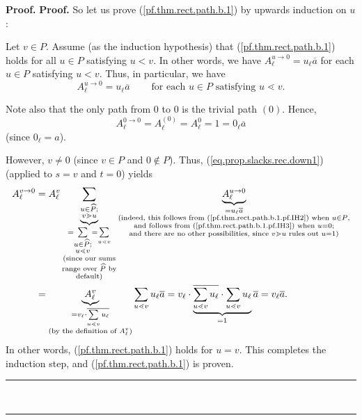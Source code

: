 \documentclass[numbers=enddot,12pt,final,onecolumn,notitlepage]{scrartcl}%
\theoremstyle{definition}
\newenvironment{verlong}{}{}
\newcommand{\downslack}{A}
\newenvironment{proof}[1][Proof]{\noindent\textbf{#1.} }{\ \rule{0.5em}{0.5em}}
\let\sumnonlimits\sum
\renewcommand{\sum}{\sumnonlimits\limits}
\begin{document}
\begin{proof}
\begin{verlong}
\begin{proof}
So let us prove (\ref{pf.thm.rect.path.b.1}) by upwards induction on $u$:

Let $v\in P$. Assume (as the induction hypothesis) that
(\ref{pf.thm.rect.path.b.1}) holds for all $u\in P$ satisfying $u<v$. In other
words, we have $\downslack_{\ell}^{u\rightarrow0}=u_{\ell}\overline{a}$ for
each $u\in P$ satisfying $u<v$. Thus, in particular, we have%
\begin{equation}
\downslack_{\ell}^{u\rightarrow0}=u_{\ell}\overline{a}%
\ \ \ \ \ \ \ \ \ \ \text{for each }u\in P\text{ satisfying }u\lessdot v.
\label{pf.thm.rect.path.b.1.pf.IH2}%
\end{equation}


Note also that the only path from $0$ to $0$ is the trivial path $\left(
0\right)  $. Hence,
\begin{equation}
\downslack_{\ell}^{0\rightarrow0}=\downslack_{\ell}^{\left(  0\right)
}=\downslack_{\ell}^{0}=1=0_{\ell}\overline{a}
\label{pf.thm.rect.path.b.1.pf.IH3}%
\end{equation}
(since $0_{\ell}=a$).

However, $v\neq0$ (since $v\in P$ and $0\notin P$). Thus,
(\ref{eq.prop.slacks.rec.down1}) (applied to $s=v$ and $t=0$) yields%
\begin{align*}
\downslack_{\ell}^{v\rightarrow0}  &  =\downslack_{\ell}^{v}\underbrace{\sum
_{\substack{u\in\widehat{P};\\v\gtrdot u}}}_{\substack{=\sum_{\substack{u\in
\widehat{P};\\u\lessdot v}}=\sum_{u\lessdot v}\\\text{(since our
sums}\\\text{range over }\widehat{P}\text{ by}\\\text{default)}}%
}\underbrace{\downslack_{\ell}^{u\rightarrow0}}_{\substack{=u_{\ell}%
\overline{a}\\\text{(indeed, this follows from
(\ref{pf.thm.rect.path.b.1.pf.IH2}) when }u\in P\text{,}\\\text{and follows
from (\ref{pf.thm.rect.path.b.1.pf.IH3}) when }u=0\text{;}\\\text{and there
are no other possibilities, since }v\gtrdot u\text{ rules out }u=1\text{)}}}\\
&  =\underbrace{\downslack_{\ell}^{v}}_{\substack{=v_{\ell}\cdot\overline
{\sum\limits_{u\lessdot v}u_{\ell}}\\\text{(by the definition of
}\downslack_{\ell}^{v}\text{)}}}\sum_{u\lessdot v}u_{\ell}\overline{a}%
=v_{\ell}\cdot\underbrace{\overline{\sum\limits_{u\lessdot v}u_{\ell}}%
\cdot\sum_{u\lessdot v}u_{\ell}}_{=1}\overline{a}=v_{\ell}\overline{a}.
\end{align*}
In other words, (\ref{pf.thm.rect.path.b.1}) holds for $u=v$. This completes
the induction step, and (\ref{pf.thm.rect.path.b.1}) is proven.
\end{proof}


\end{verlong}
\end{proof}
\end{document}
